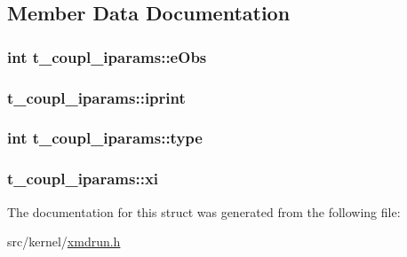 \subsection{\-Member \-Data \-Documentation}
\hypertarget{structt__coupl__iparams_afc1c840e7d553c295aa55452b319901e}{
\subsubsection[{e\-Obs}]{\setlength{\rightskip}{0pt plus 5cm}int {\bf t\-\_\-coupl\-\_\-iparams\-::e\-Obs}}}\label{structt__coupl__iparams_afc1c840e7d553c295aa55452b319901e}
\hypertarget{structt__coupl__iparams_a4cba20575de5ae3b41e9d9db0b2aa768}{
\subsubsection[{iprint}]{ {\bf t\-\_\-coupl\-\_\-iparams\-::iprint}}}\label{structt__coupl__iparams_a4cba20575de5ae3b41e9d9db0b2aa768}
\hypertarget{structt__coupl__iparams_a2d2f5373e12b6dbb64c52c575b900d7a}{
\subsubsection[{type}]{\setlength{\rightskip}{0pt plus 5cm}int {\bf t\-\_\-coupl\-\_\-iparams\-::type}}}\label{structt__coupl__iparams_a2d2f5373e12b6dbb64c52c575b900d7a}
\hypertarget{structt__coupl__iparams_a043a7b69f15199df3ed806facf2a1bc0}{
\subsubsection[{xi}]{ {\bf t\-\_\-coupl\-\_\-iparams\-::xi}}}\label{structt__coupl__iparams_a043a7b69f15199df3ed806facf2a1bc0}


\-The documentation for this struct was generated from the following file\-:\begin{DoxyCompactItemize}
\item 
src/kernel/\hyperlink{xmdrun_8h}{xmdrun.\-h}\end{DoxyCompactItemize}
